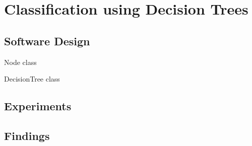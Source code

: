 \section{Classification using Decision Trees}

\subsection{Software Design}

\begin{list}{-}{}
    \item Node class
    \item DecisionTree class
\end{list}


\subsection{Experiments}

\subsection{Findings}
